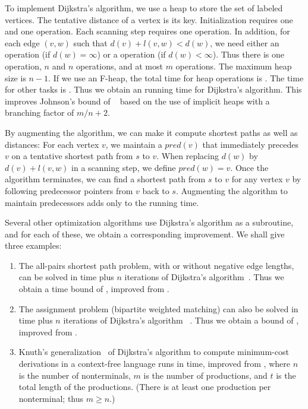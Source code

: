 To implement Dijkstra's algorithm, we use a heap to store the set of labeled
vertices. The tentative distance of a vertex is its key. Initialization requires one
 and one  operation. Each scanning step requires one
 operation. In addition, for each edge \((v, w)\) such that \(d(v)
+ l(v, w) < d(w)\), we need either an  operation (if \(d(w) = \infty\))
or a  operation (if \(d(w) < \infty\)). Thus there is one
 operation, \(n\)  and \(n\)  operations,
and at most \(m\)  operations. The maximum heap size is \(n - 1\).
If we use an F-heap, the total time for heap operations is . The
time for other tasks is . Thus we obtain an  running
time for Dijkstra's algorithm. This improves Johnson's bound of ~\cite{Johnson1977,Tarjan1983} based on the use of implicit heaps with
a branching factor of \(m/n + 2\).

By augmenting the algorithm, we can make it compute shortest paths as well as
distances: For each vertex \(v\), we maintain a 
\(pred(v)\) that immediately precedes \(v\) on a tentative shortest path from \(s\)
to \(v\). When replacing \(d(w)\) by \(d(v) + l(v, w)\) in a scanning step, we define
\(pred(w) = v\). Once the algorithm terminates, we can find a shortest path from
\(s\) to \(v\) for any vertex \(v\) by following predecessor pointers from \(v\) back
to \(s\). Augmenting the algorithm to maintain predecessors adds only  to the
running time.

Several other optimization algorithms use Dijkstra's algorithm as a subroutine, and
for each of these, we obtain a corresponding improvement. We shall give three
examples:
\begin{enumerate}
    \item The all-pairs shortest path problem, with or without negative edge lengths,
        can be solved in  time plus \(n\) iterations of Dijkstra's
        algorithm~\cite{Johnson1977,Tarjan1983}. Thus we obtain a time bound of
        , improved from .
    \item The assignment problem (bipartite weighted matching) can also be solved in
         time plus \(n\) iterations of Dijkstra's algorithm~%
        \cite{Tarjan1983}.  Thus we obtain a bound of ,
        improved from .
    \item Knuth's generalization~\cite{Knuth1977} of Dijkstra's algorithm to compute
        minimum-cost derivations in a context-free language runs in  time, improved from , where \(n\) is the number of
        nonterminals, \(m\) is the number of productions, and \(t\) is the total
        length of the productions. (There is at least one production per nonterminal;
        thus \(m \geq n\).)
\end{enumerate}

